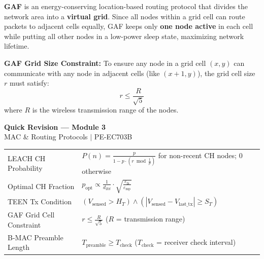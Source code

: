 \documentclass[12pt,a4paper]{article}
\renewcommand{\arraystretch}{1.45}
\begin{document}
\begin{tcolorbox}[defbox, title={\textbf{GAF (Geographic Adaptive Fidelity) --- Definition}}]
\textbf{GAF} is an energy-conserving location-based routing protocol that divides the network area into a \textbf{virtual grid}. Since all nodes within a grid cell can route packets to adjacent cells equally, GAF keeps only \textbf{one node active} in each cell while putting all other nodes in a low-power sleep state, maximizing network lifetime.
\end{tcolorbox}

\textbf{GAF Grid Size Constraint:}
To ensure any node in a grid cell $(x, y)$ can communicate with any node in adjacent cells (like $(x+1, y)$), the grid cell size $r$ must satisfy:
\[
r \leq \frac{R}{\sqrt{5}}
\]
where $R$ is the wireless transmission range of the nodes.

\newpage
\begin{center}
  {\large\bfseries\color{myred} Quick Revision --- Module 3}\\[3pt]
  {\small\color{mydark} MAC \& Routing Protocols $|$ PE-EC703B}
\end{center}
\noindent{\color{myred}\rule{\linewidth}{1.2pt}}
\vspace{4pt}

\begin{tcolorbox}[formulabox, title={\textbf{Key Formulas at a Glance}}]
\renewcommand{\arraystretch}{1.4}
\begin{tabularx}{\linewidth}{B{5.0cm} X}
LEACH CH Probability & $P(n) = \displaystyle\frac{p}{1 - p \cdot (r \bmod \frac{1}{p})}$ for non-recent CH nodes; 0 otherwise \\[4pt]
Optimal CH Fraction & $p_{\text{opt}} \propto \displaystyle\frac{1}{d_{BS}} \cdot \sqrt{\frac{\varepsilon_{\text{fs}}}{\varepsilon_{\text{mp}}}}$ \\[4pt]
TEEN Tx Condition & $(V_{\text{sensed}} > H_T) \land (|V_{\text{sensed}} - V_{\text{last\_tx}}| \geq S_T)$ \\[4pt]
GAF Grid Cell Constraint & $r \leq \displaystyle\frac{R}{\sqrt{5}}$ \quad ($R$ = transmission range) \\[4pt]
B-MAC Preamble Length & $T_{\text{preamble}} \geq T_{\text{check}}$ \quad ($T_{\text{check}}$ = receiver check interval)
\end{tabularx}
\end{tcolorbox}
\end{document}
